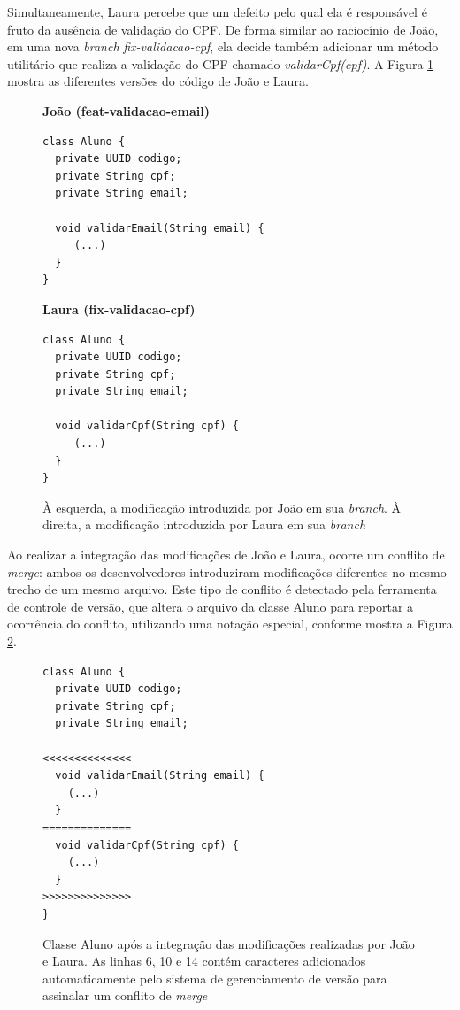 \documentclass[12pt]{article}
\begin{document}
Simultaneamente, Laura percebe que um defeito pelo qual ela é responsável é fruto da ausência de validação do CPF. De forma similar ao raciocínio de João, em uma nova \textit{branch} \textit{fix-validacao-cpf}, ela decide também adicionar um método utilitário que realiza a validação do CPF chamado \textit{validarCpf(cpf)}. A Figura \ref{fig:merge2} mostra as diferentes versões do código de João e Laura.
\begin{figure}[H]
\begin{minipage}[t]{0.5\linewidth}
\textbf{João (feat-validacao-email)}\\
\begin{verbatim}
class Aluno {
  private UUID codigo;
  private String cpf;
  private String email;

  void validarEmail(String email) {
     (...)
  }
}
\end{verbatim}
\end{minipage}
\begin{minipage}[t]{0.5\linewidth}
\textbf{Laura (fix-validacao-cpf)}\\
\begin{verbatim}
class Aluno {
  private UUID codigo;
  private String cpf;
  private String email;

  void validarCpf(String cpf) {
     (...)
  }
}
\end{verbatim}
\end{minipage}
\caption{À esquerda, a modificação introduzida por João em sua \textit{branch}. À direita, a modificação introduzida por Laura em sua \textit{branch}}
\label{fig:merge2}
\end{figure}

Ao realizar a integração das modificações de João e Laura, ocorre um conflito de \textit{merge}: ambos os desenvolvedores introduziram modificações diferentes no mesmo trecho de um mesmo arquivo. Este tipo de conflito é detectado pela ferramenta de controle de versão, que altera o arquivo da classe Aluno para reportar a ocorrência do conflito, utilizando uma notação especial, conforme mostra a Figura \ref{fig:merge3}.

\begin{figure}[H]
\begin{verbatim}
class Aluno {
  private UUID codigo;
  private String cpf;
  private String email;

<<<<<<<<<<<<<<
  void validarEmail(String email) {
    (...)
  }
==============
  void validarCpf(String cpf) {
    (...)
  }
>>>>>>>>>>>>>>
}
\end{verbatim}
\caption{Classe Aluno após a integração das modificações realizadas por João e Laura. As linhas 6, 10 e 14 contém caracteres adicionados automaticamente pelo sistema de gerenciamento de versão para assinalar um conflito de \textit{merge}}
\label{fig:merge3}
\end{figure}
\end{document}
